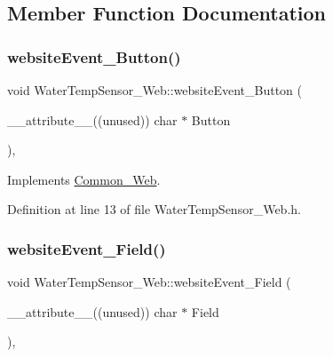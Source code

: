 \subsection{Member Function Documentation}
\mbox{\label{class_water_temp_sensor___web_a74a2ece81622e14523727c69a093477b}} 
\subsubsection{\texorpdfstring{website\+Event\+\_\+\+Button()}{websiteEvent\_Button()}}
{\footnotesize\ttfamily void Water\+Temp\+Sensor\+\_\+\+Web\+::website\+Event\+\_\+\+Button (\begin{DoxyParamCaption}\item[{\+\_\+\+\_\+attribute\+\_\+\+\_\+((unused)) char $\ast$}]{Button }\end{DoxyParamCaption})\hspace{0.3cm}{\ttfamily [inline]}, {\ttfamily [virtual]}}



Implements \hyperlink{class_common___web_acd10f27b30f3111277b4730ee5495090}{Common\+\_\+\+Web}.



Definition at line 13 of file Water\+Temp\+Sensor\+\_\+\+Web.\+h.

\mbox{\label{class_water_temp_sensor___web_a893dd03626c604d634816d0feca46706}} 
\subsubsection{\texorpdfstring{website\+Event\+\_\+\+Field()}{websiteEvent\_Field()}}
{\footnotesize\ttfamily void Water\+Temp\+Sensor\+\_\+\+Web\+::website\+Event\+\_\+\+Field (\begin{DoxyParamCaption}\item[{\+\_\+\+\_\+attribute\+\_\+\+\_\+((unused)) char $\ast$}]{Field }\end{DoxyParamCaption})\hspace{0.3cm}{\ttfamily [inline]}, {\ttfamily [virtual]}}



